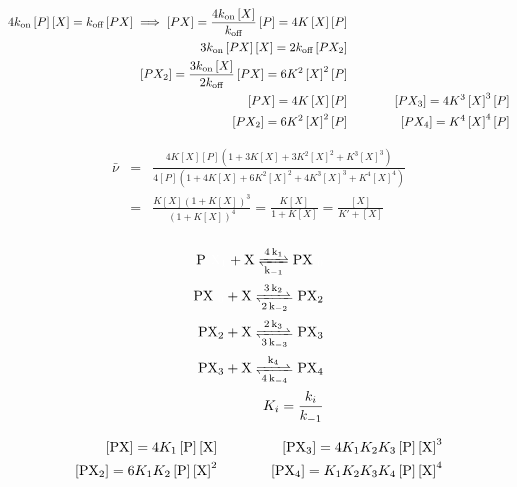 \documentclass{article}
\begin{document}
\begin{eqnarray*}
4k_{\textrm{on}} \left[ P \right]  \left[ X \right] = k_{\textrm{off}}  \left[ PX \right] \implies \left[ PX \right] = \frac{4k_{\textrm{on}}  \left[ X \right]}{k_{\textrm{off}} } \left[ P \right] = 4 K \left[ X \right] \left[ P \right]\\
3k_{\textrm{on}} \left[ PX \right]  \left[ X \right] = 2 k_{\textrm{off}}  \left[ PX_2 \right]\\
\left[ PX_2 \right] = \frac{3k_{\textrm{on}}  \left[ X \right]}{2k_{\textrm{off}} } \left[ PX \right] = 6 K^2 \left[ X \right]^2 \left[ P \right]  \\
\left[ PX \right] = 4 K  \left[ X \right] \left[ P \right] & \hspace{1 cm} & \left[ PX_3 \right] = 4 K^3  \left[ X \right]^3 \left[ P \right]\\
\left[ PX_2 \right]  = 6K^2  \left[ X \right]^2 \left[ P \right]  & \hspace{1 cm} & \left[ PX_4 \right]  = K^4 \left[ X \right]^4 \left[ P \right]
\end{eqnarray*}

\begin{eqnarray*}
\bar{\nu} & = & \frac{4 K \left[ X \right]  \left[ P \right] \left( 1 + 3 K  \left[X\right] + 3 K^2  \left[X \right]^2 + K^3  \left[X \right]^3 \right)}{4 \left[ P \right] \left( 1 + 4 K \left[X \right] + 6 K^2 \left[X \right]^2 + 4 K^3 \left[X \right]^3 + K^4 \left[X \right]^4 \right)}\\
& = & \frac{K \left[ X \right] \left( 1 + K  \left[X\right] \right)^3}{ \left( 1 + K \left[X \right] \right)^4} = \frac{K \left[ X \right]}{1 + K \left[ X \right]} = \frac{\left[ X \right]}{K' +  \left[ X \right]} 
\\
\end{eqnarray*}

\begin{eqnarray*}
\ce{P{\color{white} X_1} + X <=>[4k_1][k_{-1}] PX{\color{white} _0}}\\
\ce{PX{\color{white} _0} + X <=>[3k_2][2k_{-2}] PX_2}\\
\ce{PX_2 + X <=>[2k_3][3k_{-3}] PX_3}\\
\ce{PX_3 + X <=>[k_4][4k_{-4}] PX_4}\\
K_i = \frac{k_i}{k_{-1}}
\end{eqnarray*}

\begin{eqnarray*}
\left[ \textrm{PX} \right] = 4K_1 \left[ \textrm{P} \right]\left[ \textrm{X} \right] & \hspace{1 cm} & \left[ \textrm{PX}_3 \right] =4K_1K_2K_3 \left[ \textrm{P} \right]\left[ \textrm{X} \right]^3\\
 \left[ \textrm{PX}_2 \right] = 6K_1K_2 \left[ \textrm{P} \right]\left[ \textrm{X} \right]^2 & \hspace{1 cm} & \left[ \textrm{PX}_4 \right] =K_1K_2K_3K_4 \left[ \textrm{P} \right]\left[ \textrm{X} \right]^4
\end{eqnarray*}
\end{document}
